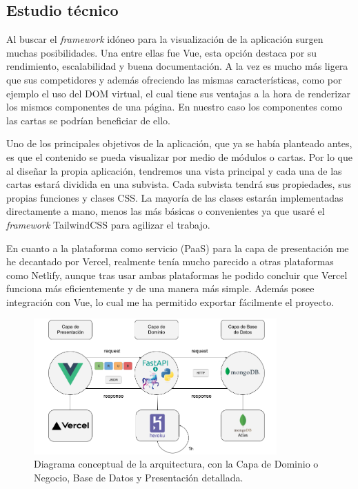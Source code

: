 \subsection{Estudio técnico}
Al buscar el \textit{framework} idóneo para la visualización de la aplicación surgen muchas posibilidades. Una entre ellas fue Vue, esta opción destaca por su rendimiento, escalabilidad y buena documentación. A la vez es mucho más ligera que sus competidores y además ofreciendo las mismas características, como por ejemplo el uso del \ac{DOM} virtual, el cual tiene sus ventajas a la hora de renderizar los mismos componentes de una página. En nuestro caso los componentes como las cartas se podrían beneficiar de ello. \cite{VueComparison}

\vspace{0.3cm}

Uno de los principales objetivos de la aplicación, que ya se había planteado antes, es que el contenido se pueda visualizar por medio de módulos o cartas. Por lo que al diseñar la propia aplicación, tendremos una vista principal y cada una de las cartas estará dividida en una subvista. Cada subvista tendrá sus propiedades, sus propias funciones y clases CSS. La mayoría de las clases estarán implementadas directamente a mano, menos las más básicas o convenientes ya que usaré el \textit{framework} TailwindCSS para agilizar el trabajo.

\vspace{0.3cm}

En cuanto a la plataforma como servicio (\ac{PaaS}) para la capa de presentación me he decantado por Vercel, realmente tenía mucho parecido a otras plataformas como Netlify, aunque tras usar ambas plataformas he podido concluir que Vercel funciona más eficientemente y de una manera más simple. Además posee integración con Vue, lo cual me ha permitido exportar fácilmente el proyecto.

\begin{figure}[H]
    \centering
    \myfloatalign
    \includegraphics[width=0.83\textwidth]{gfx/DiagramaRutas3.png}
    \caption[Diagrama conceptual con más detalle (3)]{Diagrama conceptual de la arquitectura, con la Capa de Dominio o Negocio, Base de Datos y Presentación detallada.}\label{gfx:DiagramaRutas3}
\end{figure}

